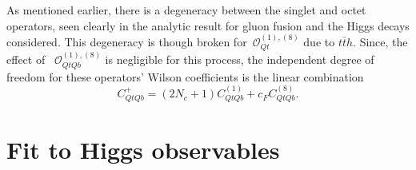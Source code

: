 	\par As mentioned earlier, there is a degeneracy between the singlet and octet operators, seen clearly in the analytic result for gluon fusion and the Higgs decays considered. This degeneracy is though broken for~$\mathcal O_{Qt}^{(1),(8)}$ due to $t\bar t h$. Since, the effect of ~$\mathcal O_{QtQb}^{(1),(8)}$ is negligible for this process, the independent degree of freedom for these operators' Wilson coefficients is the linear combination
	\begin{equation}
		C_{QtQb}^+= (2N_c+1 )C_{QtQb}^{(1)} + c_F   C_{QtQb}^{(8)}.
		\label{eq:CQtQbplus}
	\end{equation}
	\section{Fit to Higgs observables \label{sec:fit}}
	
